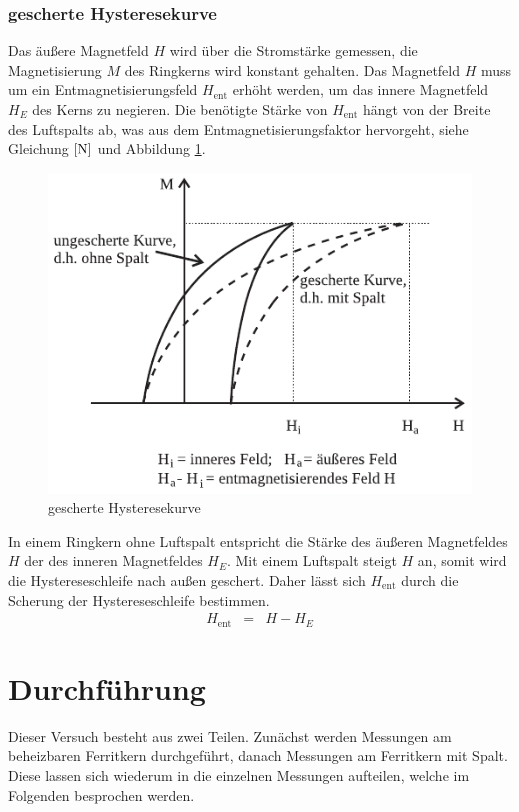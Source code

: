 \documentclass[12pt,a4paper]{scrartcl}
\numberwithin{equation}{section} %
\renewcommand{\[}{} %
\renewcommand{\]}{\noindent} %
\begin{document}
\hypertarget{gescherte-hysteresekurve}{%
\subsubsection{gescherte Hysteresekurve}\label{gescherte-hysteresekurve}}
Das äußere Magnetfeld \(H\) wird über die Stromstärke gemessen, die Magnetisierung \(M\) des Ringkerns wird konstant gehalten. Das Magnetfeld \(H\) muss um ein Entmagnetisierungsfeld \(H_\mathrm{ent}\) erhöht werden, um das innere Magnetfeld \(H_E\) des Kerns zu negieren. Die benötigte Stärke von \(H_\mathrm{ent}\) hängt von der Breite des Luftspalts ab, was aus dem Entmagnetisierungsfaktor hervorgeht, siehe Gleichung \(\eqref{N}\) und Abbildung \ref{Abb: Hysterese Scherung}.
\begin{figure}
\centering
\includegraphics{../media/B2.4/Hysteresekurve_Scherung.pdf}
\caption{gescherte Hysteresekurve}
\label{Abb: Hysterese Scherung}
\end{figure}
In einem Ringkern ohne Luftspalt entspricht die Stärke des äußeren Magnetfeldes \(H\) der des inneren Magnetfeldes \(H_E\). Mit einem Luftspalt steigt \(H\) an, somit wird die Hystereseschleife nach außen geschert. Daher lässt sich \(H_\mathrm{ent}\) durch die Scherung der Hystereseschleife bestimmen. 
\begin{eqnarray}
    H_\mathrm{ent} &=& H - H_E \label{Hscher}
\end{eqnarray}

\hypertarget{durchfuxfchrung}{%
\section{Durchführung}\label{durchfuxfchrung}}
Dieser Versuch besteht aus zwei Teilen. Zunächst werden Messungen am beheizbaren Ferritkern durchgeführt, danach Messungen am Ferritkern mit Spalt. Diese lassen sich wiederum in die einzelnen Messungen aufteilen, welche im Folgenden besprochen werden.
\end{document}
